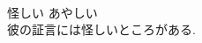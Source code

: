\documentclass[8pt]{extreport}
\begin{document}
\begin{CJK}{UTF8}{min}
\\	怪しい	あやしい	
\\	彼の証言には怪しいところがある.	
\end{CJK}
\end{document}
